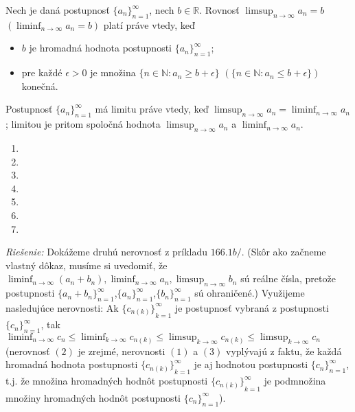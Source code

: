 \begin{veta}
Nech je daná postupnosť ${\{a_n\}}_{n=1}^\infty$, nech $b \in \mathbb{R}$. Rovnosť $\limsup_{n \rightarrow \infty} a_n =b$  $(\liminf_{n \rightarrow \infty} a_n =b)$ platí práve vtedy, keď
\begin{itemize}
\item $b$ je hromadná hodnota postupnosti ${\{a_n\}}_{n=1}^\infty$;
\item pre každé $\epsilon > 0$ je množina $\{ n \in \mathbb{N}: a_n \geq b +\epsilon \}$  $(\{  n \in \mathbb{N}: a_n \leq b +\epsilon \} )$ konečná.
\end{itemize}
\end{veta}

\begin{veta}
Postupnosť ${\{a_n\}}_{n=1}^\infty$ má limitu práve vtedy, keď $\limsup_{n \rightarrow \infty} a_n = \liminf_{n \rightarrow \infty} a_n$; limitou je pritom spoločná hodnota $\limsup_{n \rightarrow \infty} a_n$ a $\liminf_{n \rightarrow \infty} a_n$. 
\end{veta}

\begin{enumerate}[resume]
	\item {}
	\item {}
	\item {}
	\item {}
	\item {}
	\item {}
	\item {}
\end{enumerate}

\textit{Riešenie:}
Dokážeme druhú nerovnosť z príkladu $166.1b/$. (Skôr ako začneme vlastný dôkaz, musíme si uvedomiť, že $\liminf_{n \rightarrow \infty} (a_n+b_n),\liminf_{n \rightarrow \infty} a_n, \limsup_{n \rightarrow \infty} b_n$ sú reálne čísla, pretože postupnosti ${\{a_n+b_n\}}_{n=1}^\infty$,${\{a_n\}}_{n=1}^\infty$,${\{b_n\}}_{n=1}^\infty$ sú ohraničené.) Využijeme nasledujúce nerovnosti:
Ak ${\{c_{n(k)}\}}_{k=1}^\infty$ je postupnosť vybraná z postupnosti ${\{c_n\}}_{n=1}^\infty$, tak $\liminf_{n \rightarrow \infty} c_n \leq \liminf_{k \rightarrow \infty} c_{n(k)} \leq \limsup_{k \rightarrow \infty}c_{n(k)}\leq \limsup_{k \rightarrow \infty} c_n$
(nerovnosť $(2)$ je zrejmé, nerovnosti $(1)$ a $(3)$ vyplývajú z faktu, že každá hromadná hodnota postupnosti ${\{c_{n(k)}\}}_{k=1}^\infty$ je aj hodnotou postupnosti ${\{c_n\}}_{n=1}^\infty$, t.j. že množina hromadných hodnôt postupnosti ${\{c_{n(k)}\}}_{k=1}^\infty$ je podmnožina množiny hromadných hodnôt postupnosti ${\{c_n\}}_{n=1}^\infty$).

